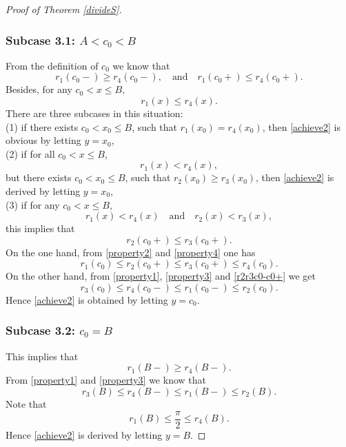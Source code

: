 \documentclass[oneside,english,a4wide]{amsart}
\numberwithin{equation}{section}
\numberwithin{figure}{section}
\theoremstyle{plain}
\theoremstyle{plain}
\theoremstyle{definition}
\theoremstyle{plain}
\theoremstyle{remark}
\theoremstyle{definition}
\theoremstyle{remark}
\theoremstyle{definition}
\newcommand{\8}{\infty}
\begin{document}
\begin{proof}[Proof of Theorem \ref{divideS}]
	\subsubsection*{Subcase 3.1:  $A<c_0<B$} 
	From the definition of $c_0$ we know that
	\begin{equation}\label{r2r3c0-c0+}
		r_1(c_0-)\ge r_4(c_0-),\quad \text{and}\quad r_1(c_0+)\le r_4(c_0+).
	\end{equation} 
	Besides, for any $c_0<x\le B$, 
	\begin{equation*}
		r_1(x)\le r_4(x).
	\end{equation*}
	There are three subcases in this situation:\\
	(1) if there exists $c_0<x_0\le B$, such that $r_1(x_0)=r_4(x_0)$, then \eqref{achieve2} is obvious by letting $y=x_0$,\\
	(2) if for all $c_0<x\le B$,
		\begin{equation*}
			r_1(x)<r_4(x),
		\end{equation*} 
		but there exists $c_0<x_0\le B$, such that $r_2(x_0)\ge r_3(x_0)$, then \eqref{achieve2} is derived by letting $y=x_0$,\\
	(3) if for any $c_0<x\le B$,
		\begin{equation*}
			r_1(x)<r_4(x)\quad \text{and} \quad r_2(x)<r_3(x),
		\end{equation*} 
		this implies that
		\begin{equation*}
			r_2(c_0+)\le r_3(c_0+).
		\end{equation*}
		On the one hand, from \eqref{property2} and \eqref{property4} one has
		\begin{equation*}
			r_1(c_0)\le r_2(c_0+)\le r_3(c_0+)\le r_4(c_0).
		\end{equation*}
		On the other hand, from \eqref{property1}, \eqref{property3} and \eqref{r2r3c0-c0+} we get
		\begin{equation*}
			r_3(c_0)\le r_4(c_0-)\le r_1(c_0-)\le r_2(c_0).
		\end{equation*}
		Hence \eqref{achieve2} is obtained by letting $y=c_0$. 

	
	\smallskip
	
	\subsubsection*{Subcase 3.2: $c_0=B$} 
	This implies that 
	\begin{equation*}
		r_1(B-)\ge r_4(B-).
	\end{equation*}
	From \eqref{property1} and \eqref{property3} we know that
	\begin{equation*}
		r_3(B)\leq r_4(B-)\le r_1(B-)\leq r_2(B).
	\end{equation*}
	Note that
	\begin{equation*}
		r_1(B)\le \frac{\pi}{2}\le r_4(B).
	\end{equation*}
	Hence \eqref{achieve2} is derived by letting $y=B$.
	

\end{proof}
\end{document}
